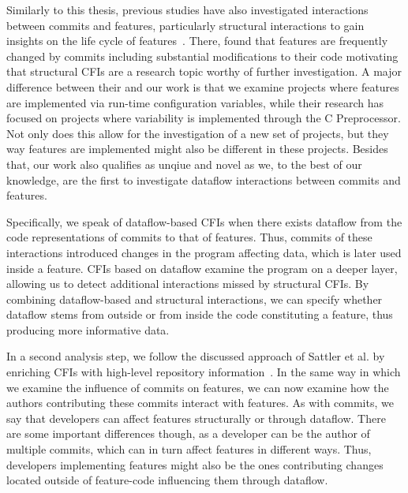 Similarly to this thesis, previous studies have also investigated interactions between commits and features, particularly structural interactions to gain insights on the life cycle of features~\cite{michelon2021lifecycle}. 
There, \citet{michelon2021lifecycle} found that features are frequently changed by commits including substantial modifications to their code motivating that structural CFIs are a research topic worthy of further investigation.
A major difference between their and our work is that we examine projects where features are implemented via run-time configuration variables, while their research has focused on projects where variability is implemented through the C Preprocessor.
Not only does this allow for the investigation of a new set of projects, but they way features are implemented might also be different in these projects.
Besides that, our work also qualifies as unqiue and novel as we, to the best of our knowledge, are the first to investigate dataflow interactions between commits and features.
\iffalse We pick up and extend on previous research by being the first to investigate interactions between commits and features.
For this, we introduce the concept of structural and dataflow-based CFIs.
Structural CFIs occur inside a program when there exists overlap between source-code changed by a commit and source-code constituting a feature.
This overlap implies that the commit changed or implemented functionality of the feature, meaning that structural CFIs can produce data on feature development. \fi
Specifically, we speak of dataflow-based CFIs when there exists dataflow from the code representations of commits to that of features.
Thus, commits of these interactions introduced changes in the program affecting data, which is later used inside a feature.
CFIs based on dataflow examine the program on a deeper layer, allowing us to detect additional interactions missed by structural CFIs.
By combining dataflow-based and structural interactions, we can specify whether dataflow stems from outside or from inside the code constituting a feature, thus producing more informative data.

In a second analysis step, we follow the discussed approach of Sattler et al. by enriching CFIs with high-level repository information~\cite{sattler2023seal}.
In the same way in which we examine the influence of commits on features, we can now examine how the authors contributing these commits interact with features.
As with commits, we say that developers can affect features structurally or through dataflow.
There are some important differences though, as a developer can be the author of multiple commits, which can in turn affect features in different ways.
Thus, developers implementing features might also be the ones contributing changes located outside of feature-code influencing them through dataflow.

